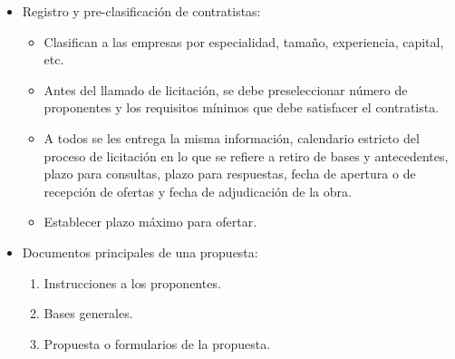 \documentclass{article} %
\begin{document}
\begin{itemize}[label={},left=0pt,align=parleft]
\begin{itemize}[label={},left=1em,align=parleft]
        \item \begin{highlightbox}[leveltwo] Registro y pre-clasificación de contratistas: \end{highlightbox}
        \begin{itemize}[label={},left=2em,align=parleft]
            \item \begin{highlightbox}[levelthree] Clasifican a las empresas por especialidad, tamaño, experiencia, capital, etc. \end{highlightbox}
            \item \begin{highlightbox}[levelthree] Antes del llamado de licitación, se debe preseleccionar número de proponentes y los requisitos mínimos que debe satisfacer el contratista. \end{highlightbox}
            \item \begin{highlightbox}[levelthree] A todos se les entrega la misma información, calendario estricto del proceso de licitación en lo que se refiere a retiro de bases y antecedentes, plazo para consultas, plazo para respuestas, fecha de apertura o de recepción de ofertas y fecha de adjudicación de la obra. \end{highlightbox}
            \item \begin{highlightbox}[levelthree] Establecer plazo máximo para ofertar. \end{highlightbox}
        \end{itemize}
        \item \begin{highlightbox}[leveltwo] Documentos principales de una propuesta: \end{highlightbox}
        \begin{enumerate}
            \item \begin{highlightbox}[levelfour] Instrucciones a los proponentes. \end{highlightbox}
            \item \begin{highlightbox}[levelfour] Bases generales. \end{highlightbox}
            \item \begin{highlightbox}[levelfour] Propuesta o formularios de la propuesta. \end{highlightbox}

\end{enumerate}
\end{itemize}
\end{itemize}
\end{document}
